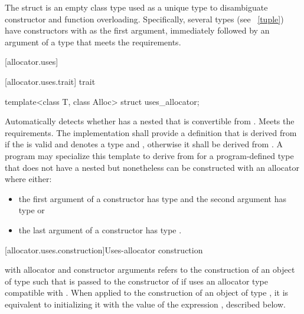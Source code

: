 \pnum
The  struct is an empty class type used as a unique type to
disambiguate constructor and function overloading. Specifically, several types (see
~\ref{tuple}) have constructors with  as the first
argument, immediately followed by an argument of a type that meets the
 requirements.

[allocator.uses]{}

[allocator.uses.trait]{ trait}

%
\begin{itemdecl}
template<class T, class Alloc> struct uses_allocator;
\end{itemdecl}

\begin{itemdescr}
\pnum
\remarks
Automatically detects whether  has a nested  that
is convertible from . Meets the 
requirements. The implementation shall provide a definition that is
derived from  if the  
is valid and denotes a type and
, otherwise it shall be
derived from . A program may specialize this template to derive from
 for a program-defined type  that does not have a nested
 but nonetheless can be constructed with an allocator where
either:
\begin{itemize}
\item the first argument of a constructor has type  and the
second argument has type  or

\item the last argument of a constructor has type .
\end{itemize}
\end{itemdescr}

[allocator.uses.construction]{Uses-allocator construction}

\pnum
{}
with allocator  and constructor arguments 
refers to the construction of an object of type 
such that  is passed to the constructor of 
if  uses an allocator type compatible with .
When applied to the construction of an object of type ,
it is equivalent to initializing it with the value of the expression
, described below.

